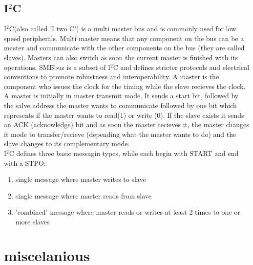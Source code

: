 \documentclass[a4paper]{scrartcl}
\begin{document}
        \subsection{I\(^2\)C}     
            I\(^2\)C(also called 'I two C') is a multi master bus and is commonly used for low speed peripherals. Multi master means that any component on the bus can be a
            master and communicate with the other components on the bus (they are called slaves). Masters can also switch as soon the current master is finished with its
            operations. SMBbus is a subset of I\(^2\)C and defines stricter protocols and electrical conventions to promote robustness and interoperability. A master is 
            the component who issues the clock for the timing while the slave recieves the clock. \\
            A master is initially in master transmit mode. It sends a start bit, followed by the salve address the master wants to communicate followed by one bit which 
            represents if the master wants to read(1) or write (0). If the slave exists it sends an ACK (acknowledge) bit and as soon the master recieves it, the master changes
            it mode to transfer/recieve (depending what the master wants to do) and the slave changes to its complementary mode. \\
            I\(^2\)C defines three basic messagin types, while each begin with START and end with a STPO:
            \begin{enumerate}
                \item single message where master writes to slave
                \item single message where master reads from slave
                \item 'combined' message where master reads or writes at least 2 times to one or more slaves
            \end{enumerate}
    
    
    
    
    
    
    
    
    \section{miscelanious}
\end{document}
